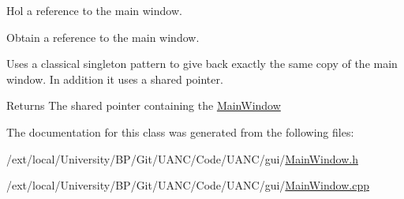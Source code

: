 Hol a reference to the main window. 

Obtain a reference to the main window.

Uses a classical singleton pattern to give back exactly the same copy of the main window. In addition it uses a shared pointer.

\begin{DoxyReturn}{Returns}
The shared pointer containing the \hyperlink{classuanc_1_1gui_1_1_main_window}{Main\+Window} 
\end{DoxyReturn}


The documentation for this class was generated from the following files\+:\begin{DoxyCompactItemize}
\item 
/ext/local/\+University/\+B\+P/\+Git/\+U\+A\+N\+C/\+Code/\+U\+A\+N\+C/gui/\hyperlink{_main_window_8h}{Main\+Window.\+h}\item 
/ext/local/\+University/\+B\+P/\+Git/\+U\+A\+N\+C/\+Code/\+U\+A\+N\+C/gui/\hyperlink{_main_window_8cpp}{Main\+Window.\+cpp}\end{DoxyCompactItemize}
